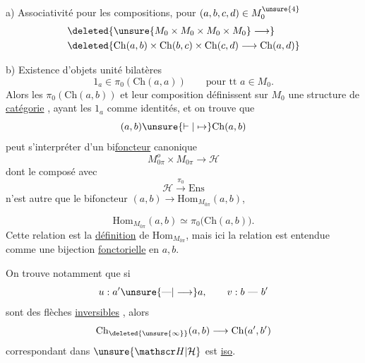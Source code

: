 a) Associativité pour les compositions, pour $(a,b,c,d)\in M_0^{\unsure{4}}$
\[
\begin{aligned}
&\deleted{\unsure{M_0\times M_0\times M_0\times M_0}\longrightarrow}\\
&\deleted{\mathrm{Ch}(a,b)\times\mathrm{Ch}(b,c)\times\mathrm{Ch}(c,d)\longrightarrow\mathrm{Ch}(a,d)}
\end{aligned}
\]

b) Existence d'objets unité bilatères
\[
1_a\in\pi_0(\mathrm{Ch}(a,a))\qquad\text{pour tt }a\in M_0.
\]
Alors les $\pi_0(\mathrm{Ch}(a,b))$ et leur composition définissent sur $M_0$\deleted{\unsure{,}}  une structure de \uline{catégorie} , ayant les $1_a$ comme identités, et on trouve que
\[
(a,b)\unsure{\vdash|\mapsto}\mathrm{Ch}(a,b)
\]
peut s'interpréter  d'un bi\uline{foncteur} canonique
\[
M_{0\pi}^{o}\times M_{0\pi}\longrightarrow\mathscr H
\]
dont le composé avec
\[
\mathscr H\xrightarrow{\pi_0}\mathrm{Ens}
\]
n'est autre que le bifoncteur $(a,b)\longrightarrow\mathrm{Hom}_{M_{0\pi}}(a,b)$,

\[
\mathrm{Hom}_{M_{0\pi}}(a,b)\simeq\pi_0\bigl(\mathrm{Ch}(a,b)\bigr).
\]
 Cette relation est la \uline{définition} de $\mathrm{Hom}_{M_{0\pi}}$, mais ici la relation est entendue comme une bijection \uline{fonctorielle} en $a,b$.

On trouve notamment que si
\[
u:a'\unsure{\text{---}|\longrightarrow}a,\qquad v:b\ \text{---}\ b'
\]
sont des flèches \uline{inversibles} , alors
\[
\mathrm{Ch}_{\deleted{\unsure{\infty}}}(a,b)\longrightarrow\mathrm{Ch}(a',b')
\]
correspondant dans $\unsure{\mathscr H|\mathcal H}$ est \uline{iso}.

